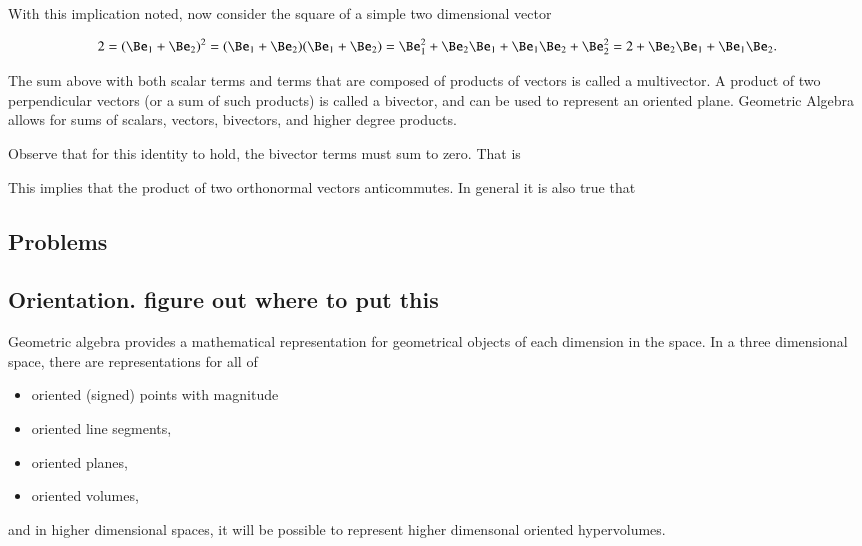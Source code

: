 With this implication noted, now consider the square of a simple two dimensional vector

\begin{dmath}\label{eqn:gaTutorial:80}
2
=
(\Be_1 + \Be_2)^2
= (\Be_1 + \Be_2)(\Be_1 + \Be_2)
= \Be_1^2 + \Be_2 \Be_1 + \Be_1 \Be_2 + \Be_2^2
= 2 + \Be_2 \Be_1 + \Be_1 \Be_2.
\end{dmath}

The sum above with both scalar terms and terms that are composed of products of vectors is called a multivector.
A product of two perpendicular vectors (or a sum of such products) is called a bivector, and can be used to represent an oriented plane.
Geometric Algebra allows for sums of scalars, vectors, bivectors, and higher degree products.

Observe that for this identity to hold, the bivector terms must sum to zero.
That is


This implies that the product of two orthonormal vectors anticommutes.
In general it is also true that


%


\subsection{Problems}

\subsection{Orientation.  figure out where to put this}
Geometric algebra provides a mathematical representation for geometrical objects of each dimension in the space.
In a three dimensional space, there are representations for all of

\begin{itemize}
\item
oriented (signed) points with magnitude
\item
oriented line segments,
\item
oriented planes,
\item
oriented volumes,
\end{itemize}

and in higher dimensional spaces, it will be possible to represent higher dimensonal oriented hypervolumes.

